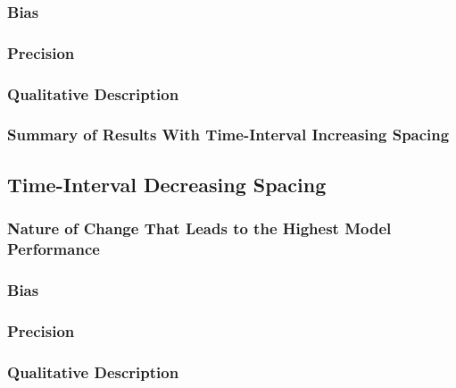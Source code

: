 \documentclass[
12pt, %
twoside,
english]{guelphthesis}
\begin{document}
\hypertarget{bias-time-inc-exp1}{%
\subsubsection{Bias}\label{bias-time-inc-exp1}}

\hypertarget{precision-time-inc-exp1}{%
\subsubsection{Precision}\label{precision-time-inc-exp1}}

\hypertarget{qualitative-time-inc-exp1}{%
\subsubsection{Qualitative Description}\label{qualitative-time-inc-exp1}}

\hypertarget{summary-of-results-with-time-interval-increasing-spacing}{%
\subsubsection{Summary of Results With Time-Interval Increasing Spacing}\label{summary-of-results-with-time-interval-increasing-spacing}}

\hypertarget{time-interval-decreasing-spacing}{%
\subsection{Time-Interval Decreasing Spacing}\label{time-interval-decreasing-spacing}}

\hypertarget{nature-change-time-dec-exp1}{%
\subsubsection{Nature of Change That Leads to the Highest Model Performance}\label{nature-change-time-dec-exp1}}

\hypertarget{bias-time-dec-exp1}{%
\subsubsection{Bias}\label{bias-time-dec-exp1}}

\hypertarget{precision-time-dec-exp1}{%
\subsubsection{Precision}\label{precision-time-dec-exp1}}

\hypertarget{qualitative-time-dec-exp1}{%
\subsubsection{Qualitative Description}\label{qualitative-time-dec-exp1}}
\end{document}
